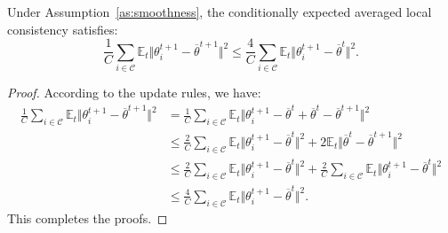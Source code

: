 \begin{lemma}
\label{J_t}
    Under Assumption~\ref{as:smoothness}, the conditionally expected averaged local consistency satisfies:
    \begin{equation}
        \frac{1}{C}\sum_{i\in\mathcal{C}}\mathbb{E}_t\Vert \theta_i^{t+1} - \overline{\theta}^{t+1}\Vert^2\leq \frac{4}{C}\sum_{i\in\mathcal{C}}\mathbb{E}_t\Vert \theta_i^{t+1} - \overline{\theta}^{t}\Vert^2.
    \end{equation}
\end{lemma}
\begin{proof}
    According to the update rules, we have:
    \begin{align*}
        \frac{1}{C}\sum_{i\in\mathcal{C}}\mathbb{E}_t\Vert \theta_i^{t+1} - \overline{\theta}^{t+1}\Vert^2
        &= \frac{1}{C}\sum_{i\in\mathcal{C}}\mathbb{E}_t\Vert \theta_i^{t+1} - \overline{\theta}^{t} + \overline{\theta}^{t} - \overline{\theta}^{t+1}\Vert^2\\
        &\leq \frac{2}{C}\sum_{i\in\mathcal{C}}\mathbb{E}_t\Vert \theta_i^{t+1} - \overline{\theta}^{t}\Vert^2 + 2\mathbb{E}_t\Vert\overline{\theta}^{t} - \overline{\theta}^{t+1}\Vert^2\\
        &\leq \frac{2}{C}\sum_{i\in\mathcal{C}}\mathbb{E}_t\Vert \theta_i^{t+1} - \overline{\theta}^{t}\Vert^2 + \frac{2}{C}\sum_{i\in\mathcal{C}}\mathbb{E}_t\Vert \theta_i^{t+1} - \overline{\theta}^{t} \Vert^2\\
        &\leq \frac{4}{C}\sum_{i\in\mathcal{C}}\mathbb{E}_t\Vert \theta_i^{t+1} - \overline{\theta}^{t}\Vert^2.
    \end{align*}
    This completes the proofs.
\end{proof}

